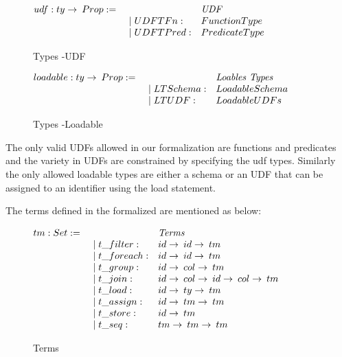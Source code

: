 \begin{figure}
\begin{center}
	$\begin{array}{@{}l@{~}l@{\quad}l@{\!\!\!\!\!\!}r}
	udf : ty \rightarrow \:Prop := & \ \ \ \ \ & \emph{UDF} \\
	& \quad \mid UDFTFn: & Function Type\\
	& \quad \mid UDFTPred: & Predicate Type\\
	\end{array}$
\end{center}
\caption{Types -UDF}
\label{fig-udf}
\end{figure}

\begin{figure}
\begin{center}
	$\begin{array}{@{}l@{~}l@{\quad}l@{\!\!\!\!\!\!}r}
	loadable : ty \rightarrow \:Prop := & \ \ \ \ \ & \emph{Loables Types} \\
	& \quad \mid LTSchema: & Loadable Schema\\
	& \quad \mid LTUDF: & Loadable UDFs\\
	\end{array}$
\end{center}
\caption{Types -Loadable}
\label{fig-loadable}
\end{figure} 

The only valid UDFs allowed in our formalization are functions and predicates and the variety in UDFs are constrained by specifying the udf types. Similarly the only allowed loadable types are either a schema or an UDF that can be assigned to an identifier using the load statement.

The terms defined in the formalized are mentioned as below:

\begin{figure}
\begin{center}
$\begin{array}{@{}l@{~}l@{\quad}l@{\!\!\!\!\!\!}r}
tm : Set := & \ \ \ \ \ & \emph{Terms} \\
& \quad \mid t\_filter: & id \rightarrow \:id \rightarrow \:tm\\
& \quad \mid t\_foreach: & id \rightarrow \:id \rightarrow \:tm\\
& \quad \mid t\_group: & id \rightarrow \:col \rightarrow \:tm\\
& \quad \mid t\_join: & id \rightarrow \:col \rightarrow \:id \rightarrow \:col \rightarrow \:tm\\
& \quad \mid t\_load: & id \rightarrow \:ty \rightarrow \:tm\\
& \quad \mid t\_assign: & id \rightarrow \:tm \rightarrow \:tm\\
& \quad \mid t\_store: & id \rightarrow \:tm\\
& \quad \mid t\_seq: & tm \rightarrow \:tm \rightarrow \:tm\\
\end{array}
$
\end{center}
\caption{Terms}
\label{fig-terms}
\end{figure}

